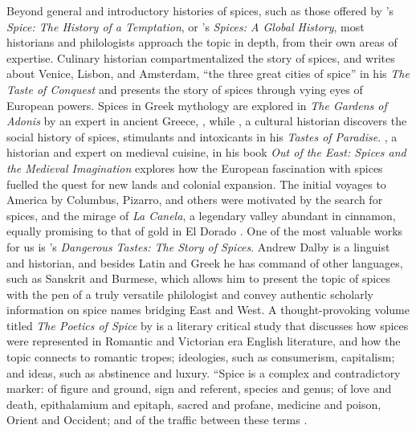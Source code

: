Beyond general and introductory histories of spices, such as those offered by \textcite{turner_spice_2004}'s \textit{Spice: The History of a Temptation}, or \textcite{czarra_spices_2009}'s \textit{Spices: A Global History}, most historians and philologists approach the topic in depth, from their own areas of expertise. Culinary historian \textcite{krondl_taste_2007} compartmentalized the story of spices, and writes about Venice, Lisbon, and Amsterdam, ``the three great cities of spice'' in his \textit{The Taste of Conquest} and presents the story of spices through vying eyes of European powers. Spices in Greek mythology are explored in \textit{The Gardens of Adonis} by an expert in ancient Greece, \textcite{detienne_gardens_1994}, while \textcite{schivelbusch_tastes_1992}, a cultural historian discovers the social history of spices, stimulants and intoxicants in his \textit{Tastes of Paradise}. \textcite{freedman_out_2008}, a historian and expert on medieval cuisine, in his book \textit{Out of the East: Spices and the Medieval Imagination} explores how the European fascination with spices fuelled the quest for new lands and colonial expansion. The initial voyages to America by Columbus, Pizarro, and others were motivated by the search for spices, and the mirage of \textit{La Canela}, a legendary valley abundant in cinnamon, equally promising to that of gold in El Dorado \autocite{dalby_christopher_2001}. One of the most valuable works for us is \textcite{dalby_dangerous_2000}'s \textit{Dangerous Tastes: The Story of Spices}. Andrew Dalby is a linguist and historian, and besides Latin and Greek he has command of other languages, such as Sanskrit and Burmese, which allows him to present the topic of spices with the pen of a truly versatile philologist and convey authentic scholarly information on spice names bridging East and West. A thought-provoking volume titled \textit{The Poetics of Spice} by \textcite{morton_poetics_2006} is a literary critical study that discusses how spices were represented in Romantic and Victorian era English literature, and how the topic connects to romantic tropes; ideologies, such as consumerism, capitalism; and ideas, such as abstinence and luxury. ``Spice is a complex and contradictory marker: of figure and ground, sign and referent, species and genus; of love and death, epithalamium and epitaph, sacred and profane, medicine and poison, Orient and Occident; and of the traffic between these terms \autocite[9]{morton_poetics_2006}.

